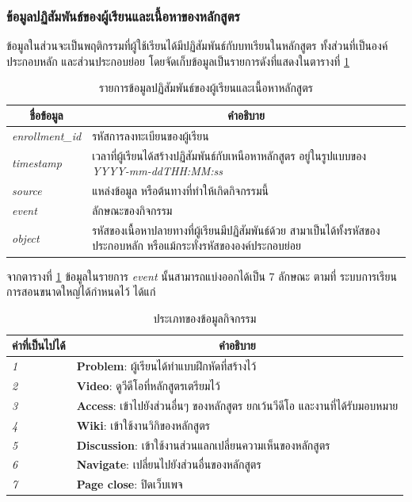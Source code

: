 \documentclass[conference]{IEEEtran}
\def\moocs{การเรียนการสอนขนาดใหญ่}
\def\MOOCs{ระบบ{\moocs}}
\newcommand*{\thead}[1]{\multicolumn{1}{c}{\bfseries #1}}
\begin{document}
    \subsubsection{ข้อมูลปฏิสัมพันธ์ของผู้เรียนและเนื้อหาของหลักสูตร}
    ข้อมูลในส่วนจะเป็นพฤติกรรมที่ผู้ใช้เรียนได้มีปฏิสัมพันธ์กับบทเรียนในหลักสูตร ทั้งส่วนที่เป็นองค์ประกอบหลัก
    และส่วนประกอบย่อย โดยจัดเก็บข้อมูลเป็นรายการดังที่แสดงในตารางที่ \ref{tab:event-feature}
    \begin{table}[ht!]
        \caption[eventinfo]{รายการข้อมูลปฏิสัมพันธ์ของผู้เรียนและเนื้อหาหลักสูตร}
        \label{tab:event-feature}
        \begin{tabular}{p{3cm} p{5cm}}
            \hline
            \thead{ชื่อข้อมูล} & \thead{คำอธิบาย} \\
            \hline
            \textit{enrollment\_id}     & รหัสการลงทะเบียนของผู้เรียน \\
            \textit{timestamp}          & เวลาที่ผู้เรียนได้สร้างปฏิสัมพันธ์กับเหนือหาหลักสูตร อยู่ในรูปแบบของ \textit{YYYY-mm-ddTHH:MM:ss} \\
            \textit{source}             & แหล่งข้อมูล หรือต้นทางที่ทำให้เกิดกิจกรรมนี้ \\
            \textit{event}              & ลักษณะของกิจกรรม \\
            \textit{object}             & รหัสของเนื้อหาปลายทางที่ผู้เรียนมีปฏิสัมพันธ์ด้วย สามาเป็นได้ทั้งรหัสของประกอบหลัก หรือแม้กระทั่งรหัสขององค์ประกอบย่อย \\
            \hline
        \end{tabular}
    \end{table}

    จากตารางที่ \ref{tab:event-feature} ข้อมูลในรายการ \textit{event} นั้นสามารถแบ่งออกได้เป็น 7 ลักษณะ ตามที่ \MOOCs ได้กำหนดไว้ ได้แก่
    \begin{table}[ht!]
        \caption[eventdetail]{ประเภทของข้อมูลกิจกรรม}
        \label{tab:event-details}
        \begin{tabular}{p{3cm} p{5cm}}
            \hline
            \thead{ค่าที่เป็นไปได้} & \thead{คำอธิบาย} \\
            \hline
            \textit{1}     & \textbf{Problem}: ผู้เรียนได้ทำแบบฝึกหัดที่สร้างไว้ \\
            \textit{2}     & \textbf{Video}: ดูวีดีโอที่หลักสูตรเตรียมไว้ \\
            \textit{3}     & \textbf{Access}: เข้าไปยังส่วนอื่นๆ ของหลักสูตร ยกเว้นวีดีโอ และงานที่ได้รับมอบหมาย \\
            \textit{4}     & \textbf{Wiki}: เข้าใช้งานวิกิของหลักสูตร \\
            \textit{5}     & \textbf{Discussion}: เข้าใช้งานส่วนแลกเปลี่ยนความเห็นของหลักสูตร \\
            \textit{6}     & \textbf{Navigate}: เปลี่ยนไปยังส่วนอื่นของหลักสูตร \\
            \textit{7}     & \textbf{Page close}: ปิดเว็บเพจ \\
            \hline
        \end{tabular}
    \end{table}
\end{document}
